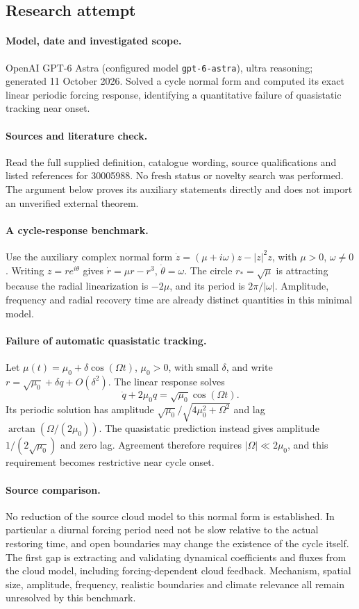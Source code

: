 \documentclass[11pt]{article}
\begin{document}
\subsection{Research attempt}
\paragraph{Model, date and investigated scope.}
OpenAI GPT-6 Astra (configured model \texttt{gpt-6-astra}), ultra reasoning; generated 11 October 2026. Solved a cycle normal form and computed its exact linear periodic forcing response, identifying a quantitative failure of quasistatic tracking near onset.

\paragraph{Sources and literature check.}
Read the full supplied definition, catalogue wording, source qualifications and listed references for 30005988. No fresh status or novelty search was performed. The argument below proves its auxiliary statements directly and does not import an unverified external theorem.

\paragraph{A cycle-response benchmark.} Use the auxiliary complex normal form \(\dot z=(\mu+i\omega)z-|z|^2z\), with \(\mu>0\), \(\omega\ne0\). Writing \(z=re^{i\theta}\) gives \(\dot r=\mu r-r^3\), \(\dot\theta=\omega\). The circle \(r_* =\sqrt\mu\) is attracting because the radial linearization is \(-2\mu\), and its period is \(2\pi/|\omega|\). Amplitude, frequency and radial recovery time are already distinct quantities in this minimal model.
\paragraph{Failure of automatic quasistatic tracking.} Let \(\mu(t)=\mu_0+\delta\cos(\Omega t)\), \(\mu_0>0\), with small \(\delta\), and write \(r=\sqrt{\mu_0}+\delta q+O(\delta^2)\). The linear response solves
\[
 \dot q+2\mu_0q=\sqrt{\mu_0}\cos(\Omega t).
\]
Its periodic solution has amplitude \(\sqrt{\mu_0}/\sqrt{4\mu_0^2+\Omega^2}\) and lag \(\arctan(\Omega/(2\mu_0))\). The quasistatic prediction instead gives amplitude \(1/(2\sqrt{\mu_0})\) and zero lag. Agreement therefore requires \(|\Omega|\ll2\mu_0\), and this requirement becomes restrictive near cycle onset.
\paragraph{Source comparison.} No reduction of the source cloud model to this normal form is established. In particular a diurnal forcing period need not be slow relative to the actual restoring time, and open boundaries may change the existence of the cycle itself. The first gap is extracting and validating dynamical coefficients and fluxes from the cloud model, including forcing-dependent cloud feedback. Mechanism, spatial size, amplitude, frequency, realistic boundaries and climate relevance all remain unresolved by this benchmark.
\end{document}

